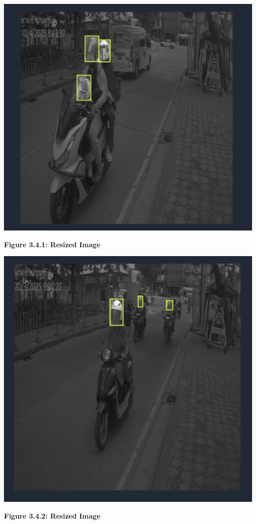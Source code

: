 \begin{center}
	\begin{minipage}{0.45\textwidth}
		\centering
		\includegraphics[width=\linewidth]{ano1.png}
		\vspace{0.7em}
		
		\textbf{Figure 3.4.1: Resized Image }
	\end{minipage}
	\hfill
	\begin{minipage}{0.45\textwidth}
		\centering
		\includegraphics[width=\linewidth]{ano2.png}
		\vspace{0.5em}
		
		\textbf{Figure 3.4.2: Resized Image }
	\end{minipage}
\end{center}

